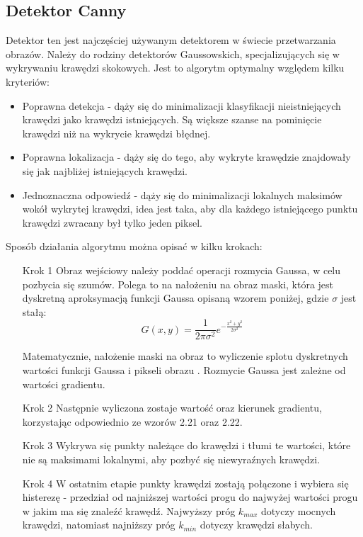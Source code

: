 \documentclass[eng,oneside]{mgr}
\begin{document}
\subsection{Detektor Canny}
Detektor ten jest najczęściej używanym detektorem w świecie przetwarzania obrazów. Należy do rodziny detektorów Gaussowskich, specjalizujących się w wykrywaniu krawędzi skokowych. Jest to algorytm optymalny względem kilku kryteriów:
\begin{itemize}
\item Poprawna detekcja - dąży się do minimalizacji klasyfikacji nieistniejących krawędzi jako krawędzi istniejących. Są większe szanse na pominięcie krawędzi niż na wykrycie krawędzi błędnej.
\item Poprawna lokalizacja - dąży się do tego, aby wykryte krawędzie znajdowały się jak najbliżej istniejących krawędzi.
\item Jednoznaczna odpowiedź - dąży się do minimalizacji lokalnych maksimów wokół wykrytej krawędzi, idea jest taka, aby dla każdego istniejącego punktu krawędzi zwracany był tylko jeden piksel.
\end{itemize}
\par Sposób działania algorytmu można opisać w kilku krokach:
\begin{itemize}
\item [Krok 1] Obraz wejściowy należy poddać operacji rozmycia Gaussa, w celu pozbycia się szumów. Polega to na nałożeniu na obraz maski, która jest dyskretną aproksymacją funkcji Gaussa opisaną wzorem poniżej, gdzie $\sigma$ jest stałą:
\begin{equation}
G(x,y) = \frac{1}{2\pi\sigma^2}e^{-\frac{x^2+y^2}{2\sigma^2}}
\end{equation}
\par Matematycznie, nałożenie maski na obraz to wyliczenie splotu dyskretnych wartości funkcji Gaussa i pikseli obrazu  \cite{gauss}. Rozmycie Gaussa jest zależne od wartości gradientu.
\item [Krok 2] Następnie wyliczona zostaje wartość oraz kierunek gradientu, korzystając odpowiednio ze wzorów 2.21 oraz 2.22. 
\item [Krok 3] Wykrywa się punkty należące do krawędzi i tłumi te wartości, które nie są maksimami lokalnymi, aby pozbyć się niewyraźnych krawędzi.
\item [Krok 4]  W ostatnim etapie punkty krawędzi zostają połączone i wybiera się histerezę - przedział od najniższej wartości progu do najwyżej wartości progu w jakim ma się znaleźć krawędź. Najwyższy próg $k_{max}$ dotyczy mocnych krawędzi, natomiast najniższy próg $k_{min}$ dotyczy krawędzi słabych.
\end{itemize}
\end{document}
